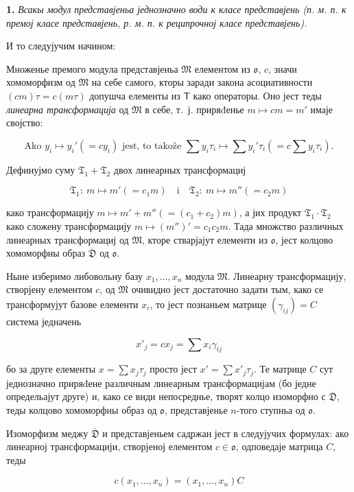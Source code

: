 \documentclass[11pt]{article}
\begin{document}
\textbf{1.} \emph{Всакы модул представјеньа једнозначно води к класе представјень (п. м. п. к премој класе представјень, р. м. п. к реципрочној класе представјень).}

И то следујучим начином:

Множенье премого модула представјеньа \(\mathfrak M\) елементом из \(\mathfrak{o}\), \(c\), значи хомоморфизм од \(\mathfrak M\) на себе самого, кторы заради закона асоциативности \((cm)\tau=c(m\tau)\) допушча елементы из \(\mathsf T\) како операторы. Оно јест теды \emph{линеарна трансформација} од \(\mathfrak M\) в себе, т.~ј. приряđенье \(m\mapsto cm=m'\) имаје својство:

\[
\text{Ako } y_i\mapsto y_i'(=cy_i) \text{ jest, to takože }
\sum y_i\tau_i\mapsto \sum y_i'\tau_i\left(=c\sum y_i\tau_i\right).
\]

Дефинујмо суму \(\mathfrak T_1+\mathfrak T_2\) двох линеарных трансформациј

\[
\mathfrak T_1:\ m\mapsto m'(=c_1m)
\quad\text{i}\quad
\mathfrak T_2:\ m\mapsto m''(=c_2m)
\]

како трансформацију \(m\mapsto m'+m''(=(c_1+c_2)m)\), а јих продукт \(\mathfrak T_1\cdot\mathfrak T_2\) како сложену трансформацију \(m\mapsto (m'')'=c_1c_2m\). Тада множство различных линеарных трансформациј од \(\mathfrak M\), кторе стварјајут елементи из \(\mathfrak{o}\), јест колцово хомоморфны образ \(\overline{\mathfrak D}\) од \(\mathfrak{o}\).

Ныне изберимо либовольну базу \(x_1,\ldots,x_n\) модула \(\mathfrak M\). Линеарну трансформацију, створјену елементом \(c\), од \(\mathfrak M\) очивидно јест достаточно задати тым, како се трансформујут базове елементи \(x_i\), то јест познаньем матрице \((\gamma_{ij})=C\) система једначень

\[
x'_j=cx_j=\sum x_i\gamma_{ij}
\]

бо за друге елементы \(x=\sum x_j\tau_j\) просто јест \(x'=\sum x'_j\tau_j\). Те матрице \(C\) сут једнозначно приряđене различным линеарным трансформацијам (бо једне определьајут друге) и, како се види непосреднье, творят колцо изоморфно с \(\overline{\mathfrak D}\), теды колцово хомоморфны образ од \(\mathfrak{o}\), представјенье \(n\)-того ступньа од \(\mathfrak{o}\).

Изоморфизм меджу \(\overline{\mathfrak D}\) и представјеньем садржан јест в следујучих формулах: ако линеарној трансформацији, створјеној елементом \(c\in\mathfrak{o}\), одповедаје матрица \(C\), теды

\[
c(x_1,\ldots,x_n)=(x_1,\ldots,x_n)C
\]
\end{document}
